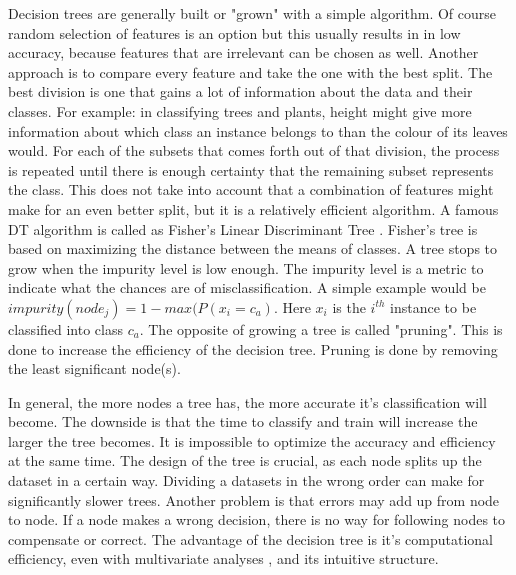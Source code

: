 Decision trees are generally built or "grown" with a simple algorithm. Of course random selection of features is an option but this usually results in in low accuracy, because features that are irrelevant can be chosen as well. Another approach is to compare every feature and take the one with the best split. The best division is one that gains a lot of information about the data and their classes. For example: in classifying trees and plants, height might give more information about which class an instance belongs to than the colour of its leaves would. For each of the subsets that comes forth out of that division, the process is repeated until there is enough certainty that the remaining subset represents the class. This does not take into account that a combination of features might make for an even better split, but it is a relatively efficient algorithm. A famous DT algorithm is called as Fisher's Linear Discriminant Tree \cite{LópezChau20136283}. Fisher's tree is based on maximizing the distance between the means of classes. A tree stops to grow when the impurity level is low enough. The impurity level is a metric to indicate what the chances are of misclassification. A simple example would be $impurity(node_j) = 1 - max(P(x_i = c_a) $. Here $x_i$ is the $i^{th}$ instance to be classified into class $c_a$. The opposite of growing a tree is called "pruning". This is done to increase the efficiency of the decision tree. Pruning is done by removing the least significant node(s).

In general, the more nodes a tree has, the more accurate it's classification will become. The downside is that the time to classify and train will increase the larger the tree becomes. It is impossible to optimize the accuracy and efficiency at the same time. The design of the tree is crucial, as each node splits up the dataset in a certain way. Dividing a datasets in the wrong order can make for significantly slower trees. Another problem is that errors may add up from node to node. If a node makes a wrong decision, there is no way for following nodes to compensate or correct. The advantage of the decision tree is it's computational efficiency, even with multivariate analyses \cite{safavian1991survey}, and its intuitive structure.